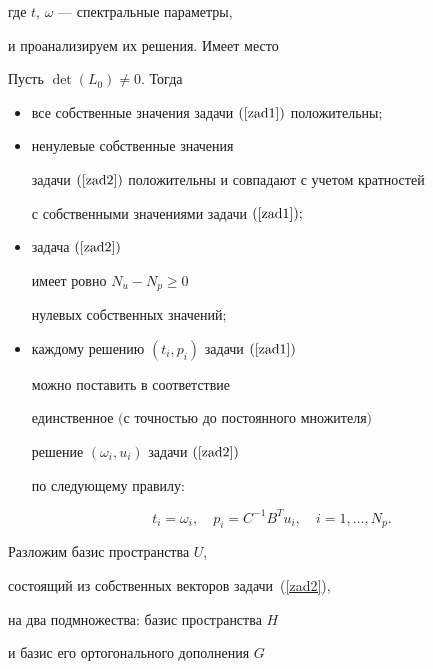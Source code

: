где $t$, $\omega$ --- спектральные параметры,


и проанализируем их решения. Имеет место~\cite{Chizh0}





\begin{thm}


Пусть $\det (L_{0}) \neq 0 $. Тогда


\begin{itemize}


\item[1)] все собственные значения задачи $(\ref{zad1})$ положительны\/$;$


\item[2)] ненулевые собственные значения


задачи $(\ref{zad2})$ положительны и совпадают с учетом кратностей


с собственными значениями задачи $(\ref{zad1});$


\item[3)] задача $(\ref{zad2})$


имеет ровно $N_u - N_p \geq 0$


нулевых собственных значений\/$;$


\item[4)] каждому решению $(t_i,p_i)$ задачи $(\ref{zad1})$


можно поставить в соответствие


единственное $($с точностью до постоянного множителя\/$)$


решение $(\omega_i,u_i)$ задачи $(\ref{zad2})$


по следующему правилу\/${:}$


$$


t_i = \omega_i, \quad p_i = C^{-1}B^T u_i, \quad i = 1, \dotsc, N_p .


$$


\end{itemize}


\end{thm}





Разложим базис пространства $U$,


состоящий из собственных векторов задачи~(\ref{zad2}),


на два подмножества: базис пространства $H$


и базис его ортогонального дополнения $G$


$$


